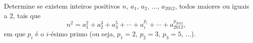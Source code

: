 Determine se existem inteiros positivos $n$, $a_1$, $a_2$, $\dots$, $a_2012$, todos maiores ou iguais a $2$, tais que
$$ n^2 = a_1^2 + a_2^3 + a_3^5 + \cdots + a_i^{p_i} + \cdots + a_{2012}^{p_{2012}}, $$
em que $p_i$ é o $i$-ésimo primo (ou seja, $p_1 = 2$, $p_2 = 3$, $p_3 = 5$, $\dots$).